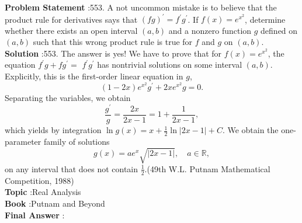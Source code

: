 \documentclass[10pt]{article}
\begin{document}
\textbf{Problem Statement} :553. A not uncommon mistake is to believe that the product rule for derivatives says that $(f g)^{\prime}=f^{\prime} g^{\prime}$. If $f(x)=e^{x^{2}}$, determine whether there exists an open interval $(a, b)$ and a nonzero function $g$ defined on $(a, b)$ such that this wrong product rule is true for $f$ and $g$ on $(a, b)$.\\
\textbf{Solution} :553. The answer is yes! We have to prove that for $f(x)=e^{x^{2}}$, the equation $f^{\prime} g+f g^{\prime}=$ $f^{\prime} g^{\prime}$ has nontrivial solutions on some interval $(a, b)$. Explicitly, this is the first-order linear equation in $g$,$$ (1-2 x) e^{x^{2}} g^{\prime}+2 x e^{x^{2}} g=0 . $$Separating the variables, we obtain$$ \frac{g^{\prime}}{g}=\frac{2 x}{2 x-1}=1+\frac{1}{2 x-1}, $$which yields by integration $\ln g(x)=x+\frac{1}{2} \ln |2 x-1|+C$. We obtain the one-parameter family of solutions$$ g(x)=a e^{x} \sqrt{|2 x-1|}, \quad a \in \mathbb{R}, $$on any interval that does not contain $\frac{1}{2}$.(49th W.L. Putnam Mathematical Competition, 1988)\\
\textbf{Topic} :Real Analysis\\
\textbf{Book} :Putnam and Beyond\\
\textbf{Final Answer} :\\
\end{document}
